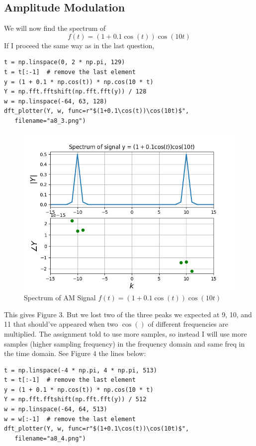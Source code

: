 \documentclass[11pt, a4paper]{article}
\begin{document}
\subsection{Amplitude Modulation}
We will now find the spectrum of $$f(t)=(1+0.1\cos(t))\cos(10t)$$ 
If I proceed the same way as in the last question,
\begin{verbatim}
t = np.linspace(0, 2 * np.pi, 129)
t = t[:-1]  # remove the last element
y = (1 + 0.1 * np.cos(t)) * np.cos(10 * t)
Y = np.fft.fftshift(np.fft.fft(y)) / 128
w = np.linspace(-64, 63, 128)
dft_plotter(Y, w, func=r"$(1+0.1\cos(t))\cos(10t)$", 
   filename="a8_3.png")
\end{verbatim} 
\begin{figure}[!tbh]
   	\centering
  \includegraphics[scale=0.5]{a8_3.png} 
    \caption{Spectrum of AM Signal $f(t)=(1+0.1\cos(t))\cos(10t)$} 
   \end{figure} 
   
This gives Figure 3. But we lost two of the three peaks we expected at 9, 10, and 11 that should've appeared when two $\cos()$ of different frequencies are multiplied. The assignment told to use more samples, so instead I will use more samples (higher sampling frequency) in the frequency domain and same freq in the time domain. See Figure 4 the lines below:
\begin{verbatim}
t = np.linspace(-4 * np.pi, 4 * np.pi, 513)
t = t[:-1]  # remove the last element
y = (1 + 0.1 * np.cos(t)) * np.cos(10 * t)
Y = np.fft.fftshift(np.fft.fft(y)) / 512
w = np.linspace(-64, 64, 513)
w = w[:-1]  # remove the last element
dft_plotter(Y, w, func=r"$(1+0.1\cos(t))\cos(10t)$",
   filename="a8_4.png")
\end{verbatim}
\end{document}
